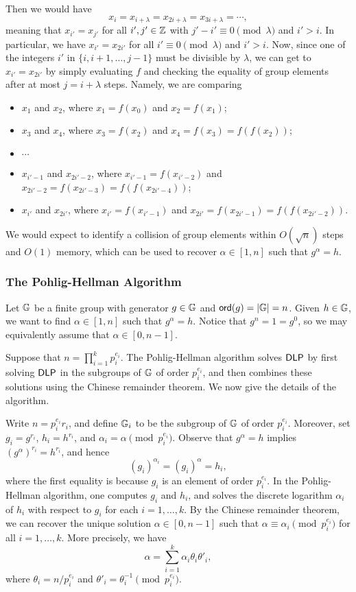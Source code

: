 Then we would have 
\[ x_i = x_{i+\lambda} = x_{2i+\lambda} = x_{3i+\lambda} = \cdots, \]
meaning that $x_{i'} = x_{j'}$ for all $i', j' \in \mathbb{Z}$ with $j' - i' \equiv 0 \pmod 
\lambda$ and $i' > i$. In particular, we have $x_{i'} = x_{2i'}$ for all 
$i' \equiv 0 \pmod \lambda$ and $i' > i$. Now, since one of the integers $i'$ 
in $\{i, i+1, \dots, j-1\}$ must be divisible by $\lambda$, we can get to 
$x_{i'} = x_{2i'}$ by simply evaluating $f$ and checking the equality of 
group elements after at most $j = i+\lambda$ steps. Namely, we are comparing 
\begin{itemize}
      \item $x_1$ and $x_2$, where $x_1 = f(x_0)$ and $x_2 = f(x_1)$; 
      \item $x_3$ and $x_4$, where $x_3 = f(x_2)$ and $x_4 = f(x_3) = f(f(x_2))$;
      \item $\cdots$
      \item $x_{i'-1}$ and $x_{2i'-2}$, where $x_{i'-1} = f(x_{i'-2})$ and 
            $x_{2i'-2} = f(x_{2i'-3}) = f(f(x_{2i'-4}))$; 
      \item $x_{i'}$ and $x_{2i'}$, where $x_{i'} = f(x_{i'-1})$ and 
            $x_{2i'} = f(x_{2i'-1}) = f(f(x_{2i'-2}))$. 
\end{itemize}
We would expect to identify a collision of group elements within $O(\sqrt n)$ 
steps and $O(1)$ memory, which can be used to recover $\alpha \in [1, n]$ 
such that $g^\alpha = h$. 

\subsubsection{The Pohlig-Hellman Algorithm}
Let $\mathbb{G}$ be a finite group with generator $g \in \mathbb{G}$ and ${\sf ord}(g) = |\mathbb{G}| = n$. 
Given $h \in \mathbb{G}$, we want to find $\alpha \in [1, n]$ such that $g^\alpha = h$. 
Notice that $g^n = 1 = g^0$, so we may equivalently assume that $\alpha 
\in [0, n-1]$. 

Suppose that $n = \prod_{i=1}^k p_i^{e_i}$. The Pohlig-Hellman algorithm 
\cite{1055817} solves ${\sf DLP}$ by first solving ${\sf DLP}$ in the subgroups of $\mathbb{G}$ 
of order $p_i^{e_i}$, and then combines these solutions using the Chinese 
remainder theorem. We now give the details of the algorithm. 

Write $n = p_i^{e_i} r_i$, and define $\mathbb{G}_i$ to be the subgroup of $\mathbb{G}$ of order 
$p_i^{e_i}$. Moreover, set $g_i = g^{r_i}$, $h_i = h^{r_i}$, and 
$\alpha_i = \alpha \pmod{p_i^{e_i}}$. Observe that $g^\alpha = h$ implies 
$(g^\alpha)^{r_i} = h^{r_i}$, and hence 
\[ (g_i)^{\alpha_i} = (g_i)^\alpha = h_i, \] 
where the first equality is because $g_i$ is an element of order $p_i^{e_i}$. 
In the Pohlig-Hellman algorithm, one computes $g_i$ and $h_i$, and solves the 
discrete logarithm $\alpha_i$ of $h_i$ with respect to $g_i$ for each 
$i = 1, \dots, k$. By the Chinese remainder theorem, we can recover the unique 
solution $\alpha \in [0, n-1]$ such that $\alpha \equiv \alpha_i 
\pmod{p_i^{e_i}}$ for all $i = 1, \dots, k$. More precisely, we have 
\[ \alpha = \sum_{i=1}^k \alpha_i \theta_i \theta'_i, \] 
where $\theta_i = n/p_i^{e_i}$ and $\theta'_i = \theta_i^{-1} \pmod{p_i^{e_i}}$. 


